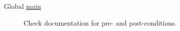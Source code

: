 \label{todo__todo000001}
\hypertarget{todo__todo000001}{}
 \begin{description}
\item[Global \hyperlink{main_8cpp_bf9e6b7e6f15df4b525a2e7705ba3089}{main} ]Check documentation for pre- and post-conditions.

\end{description}
